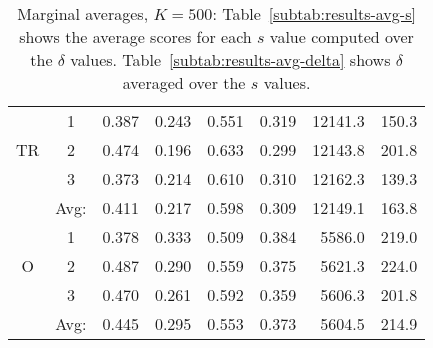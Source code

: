 \begin{enumerate}
{{\begin{table}[htb]
{\begin{tabular}{cc|ccccrr}
\multirow{ 3}{*}{TR} & 1 & 0.387 & 0.243 & 0.551 & 0.319 & 12141.3 & 150.3 \\
& 2 & 0.474 & 0.196 & 0.633 & 0.299 & 12143.8 & 201.8 \\
& 3 & 0.373 & 0.214 & 0.610 & 0.310 & 12162.3 & 139.3 \\ \cline{2-8}
& Avg: & 0.411 & 0.217 & 0.598 & 0.309 & 12149.1 & 163.8 \\ \hline
\multirow{ 3}{*}{O} & 1 & 0.378 & 0.333 & 0.509 & 0.384 & 5586.0 & 219.0 \\
& 2 & 0.487 & 0.290 & 0.559 & 0.375 & 5621.3 & 224.0 \\
& 3 & 0.470 & 0.261 & 0.592 & 0.359 & 5606.3 & 201.8 \\ \cline{2-8}
& Avg: & 0.445 & 0.295 & 0.553 & 0.373 & 5604.5 & 214.9 \\  \hline
\end{tabular}
}
\caption{Marginal averages, $K=500$: Table~\ref{subtab:results-avg-s} shows the average scores for each $s$ value computed over the $\delta$ values. Table~\ref{subtab:results-avg-delta} shows $\delta$ averaged over the $s$ values.} 
\label{tab:marginal-avgs-500}
\end{table}

}}
\end{enumerate}
